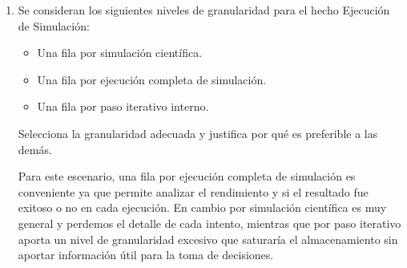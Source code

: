 \begin{enumerate}
        Por ejemplo, para la primera fila (ejecución):
        \begin{itemize}
            \item Se realiza la ejecución con id \texttt{0001}.
            \item La ejecución se realizó en el tiempo marcado con el id \texttt{1345-25202-0305-260202} (en este caso modelado como llave inteligente de la dimensión \texttt{Tiempo}), que representa que el inicio fue a las 13:45 del 25-02-02, y finalizó a las 03:05 del 26-02-02.
            \item La fila corresponde a una ejecución de la simulación con id \texttt{S1}.
            \item La ejecución la realizó el investigador con iniciales de CURP \texttt{JILS030405}.
            \item Esta ejecución fue procesada en el recurso con id \texttt{A1}.
            \item El resultado de esta ejecución fue 1 (éxito).
        \end{itemize}

        \item Se consideran los siguientes niveles de granularidad para el hecho Ejecución de Simulación:

            \begin{itemize}
                \item Una fila por simulación científica.
                \item Una fila por ejecución completa de simulación.
                \item Una fila por paso iterativo interno.
            \end{itemize}

        Selecciona la granularidad adecuada y justifica por qué es preferible a las demás.

        Para este escenario, una fila por ejecución completa de simulación es conveniente ya que permite analizar el rendimiento y si el resultado fue exitoso o no en cada ejecución. En cambio por simulación científica es muy general y perdemos el detalle de cada intento, mientras que por paso iterativo aporta un nivel de granularidad excesivo que saturaría el almacenamiento sin aportar información útil para la toma de decisiones.


\end{enumerate}
